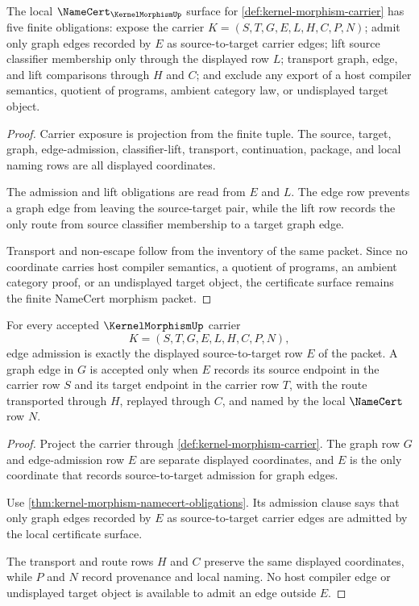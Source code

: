 \begin{theorem}
\label{thm:kernel-morphism-namecert-obligations}
The local $\NameCert_{\KernelMorphismUp}$ surface for \autoref{def:kernel-morphism-carrier} has five finite obligations: expose the carrier $K=(S,T,G,E,L,H,C,P,N)$; admit only graph edges recorded by $E$ as source-to-target carrier edges; lift source classifier membership only through the displayed row $L$; transport graph, edge, and lift comparisons through $H$ and $C$; and exclude any export of a host compiler semantics, quotient of programs, ambient category law, or undisplayed target object.
\end{theorem}
\begin{proof}
Carrier exposure is projection from the finite tuple. The source, target, graph, edge-admission, classifier-lift, transport, continuation, package, and local naming rows are all displayed coordinates.

The admission and lift obligations are read from $E$ and $L$. The edge row prevents a graph edge from leaving the source-target pair, while the lift row records the only route from source classifier membership to a target graph edge.

Transport and non-escape follow from the inventory of the same packet. Since no coordinate carries host compiler semantics, a quotient of programs, an ambient category proof, or an undisplayed target object, the certificate surface remains the finite NameCert morphism packet.
\end{proof}

\begin{theorem}
\label{thm:kernel-morphism-edge-admission-obligation}
For every accepted $\KernelMorphismUp$ carrier
$$
K=(S,T,G,E,L,H,C,P,N),
$$
edge admission is exactly the displayed source-to-target row $E$ of the packet. A graph edge in $G$ is accepted only when $E$ records its source endpoint in the carrier row $S$ and its target endpoint in the carrier row $T$, with the route transported through $H$, replayed through $C$, and named by the local $\NameCert$ row $N$.
\end{theorem}
\begin{proof}
Project the carrier through \autoref{def:kernel-morphism-carrier}. The graph row $G$ and edge-admission row $E$ are separate displayed coordinates, and $E$ is the only coordinate that records source-to-target admission for graph edges.

Use \autoref{thm:kernel-morphism-namecert-obligations}. Its admission clause says that only graph edges recorded by $E$ as source-to-target carrier edges are admitted by the local certificate surface.

The transport and route rows $H$ and $C$ preserve the same displayed coordinates, while $P$ and $N$ record provenance and local naming. No host compiler edge or undisplayed target object is available to admit an edge outside $E$.
\end{proof}

